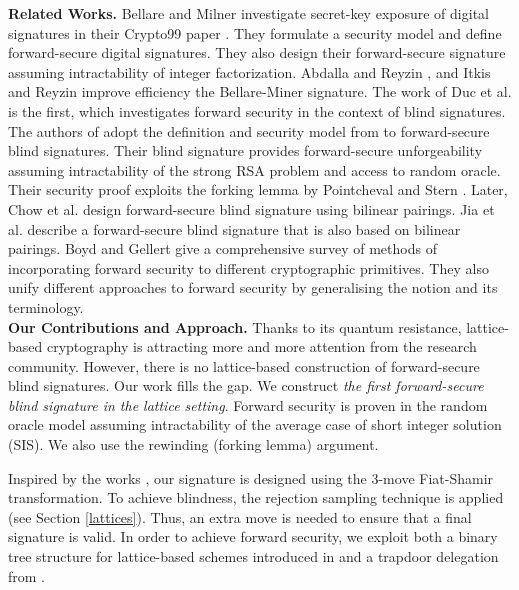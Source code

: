 \documentclass[runningheads]{llncs}
\begin{document}
\noindent \textbf{Related Works.} 
Bellare and Milner investigate secret-key exposure of digital signatures in their Crypto99 paper \cite{BM99}.
They formulate a security model and define forward-secure digital signatures.
They also design their forward-secure signature assuming intractability of integer factorization. 
Abdalla and Reyzin \cite{AR00}, and Itkis and Reyzin \cite{IR01} improve efficiency
the Bellare-Miner signature. 
The work of Duc et al. \cite{DCK03} is the first, which investigates forward security in the context of blind signatures.
The authors of  \cite{DCK03} adopt the definition and security model 
from \cite{BM99} to forward-secure blind signatures.
Their blind signature provides forward-secure unforgeability assuming intractability of the strong RSA problem
and access to random oracle.
Their security proof exploits the forking lemma by Pointcheval and Stern \cite{PS96}. 
Later, Chow et al. \cite{CHYC05} design forward-secure blind signature using bilinear pairings.
Jia et al. \cite{JFC+10} describe a forward-secure blind signature that is also based on bilinear pairings.
Boyd and Gellert \cite{BG19} give a comprehensive survey of methods of incorporating 
forward security to different cryptographic primitives. 
They also unify different approaches to forward security by generalising the notion and its terminology.\\

\noindent \textbf{Our Contributions and Approach.} 
Thanks to its quantum resistance,  lattice-based cryptography is attracting more and more 
attention from the research community.
However, there is no lattice-based construction of forward-secure blind signatures.
Our work fills the gap. We construct \textit{the first forward-secure blind signature in the lattice setting}. 
Forward security is proven in the random oracle model assuming intractability of the average case of short integer 
solution (SIS). We also use the rewinding (forking lemma) argument. 

Inspired by the works \cite{LDS20,Ruc10,ZJZ+18}, 
our signature is designed using the 3-move Fiat-Shamir transformation.
To achieve blindness, the rejection sampling technique is applied (see Section \ref{lattices}).
Thus, an extra move is needed to ensure that a final signature is valid.
In order to achieve forward security, we exploit both
a binary tree structure for lattice-based schemes introduced in \cite{CHKP10} 
and a trapdoor delegation from \cite{ABB10-EuroCrypt,CHKP10}. 
\end{document}
